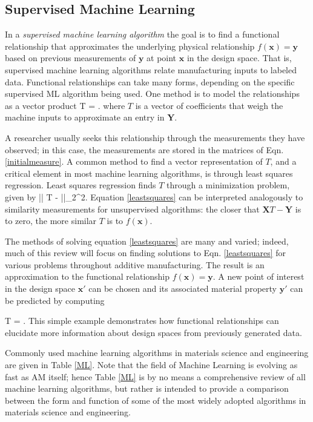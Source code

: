 \subsection{Supervised Machine Learning}
In a \textit{supervised machine learning algorithm} the goal is to find a functional relationship that approximates the underlying physical relationship $f(\mathbf{x}) = \mathbf{y}$ based on previous measurements of $\mathbf{y}$ at point $\mathbf{x}$ in the design space. That is, supervised machine learning algorithms relate manufacturing inputs to labeled data. Functional relationships can take many forms, depending on the specific supervised ML algorithm being used. One method is to model the relationships as a vector product 
\eqn
{}T = .
\label{map}
\equ
where $T$ is a vector of coefficients that weigh the machine inputs to approximate an entry in $\mathbf{Y}$. 

A researcher usually seeks this relationship through the measurements they have observed; in this case, the measurements are stored in the matrices of Eqn. \ref{initialmeasure}.
A common method to find a vector representation of $T$, and a critical element in most machine learning algorithms, is through least squares regression. Least squares regression finds $T$ through a minimization problem, given by
\eqn
\min || T -  ||_{2}^{2}.
\label{leastsquares}
\equ
Equation \ref{leastsquares} can be interpreted analogously to similarity measurements for unsupervised algorithms: the closer that $\mathbf{X}T - \mathbf{Y}$ is to zero, the more similar $T$ is to $f(\mathbf{x})$.

The methods of solving equation \ref{leastsquares} are many and varied; indeed, much of this review will focus on finding solutions to Eqn. \ref{leastsquares} for various problems throughout additive manufacturing.
The result is an approximation to the functional relationship $f(\mathbf{x}) = \mathbf{y}$.
A new point of interest in the design space $\mathbf{x'}$ can be chosen and its associated material property $\mathbf{y'}$ can be predicted by computing

\eqn
{}T = .
\equ
This simple example demonstrates how functional relationships can elucidate more information about design spaces from previously generated data.

Commonly used machine learning algorithms in materials science and engineering are given in Table \ref{ML}.
Note that the field of Machine Learning is evolving as fast as AM itself; hence Table \ref{ML} is by no means a comprehensive review of all machine learning algorithms, but rather is intended to provide a comparison between the form and function of some of the most widely adopted algorithms in materials science and engineering.

